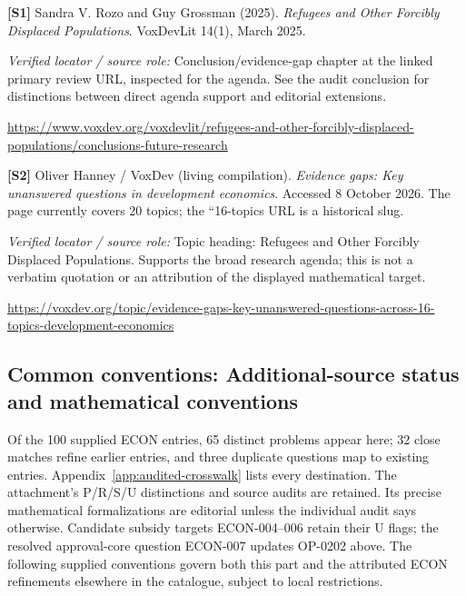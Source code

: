 \documentclass[11pt,a4paper]{article}
\begin{document}
{\footnotesize\raggedright
\par\noindent\textbf{[S1]} Sandra V. Rozo and Guy Grossman (2025). \emph{Refugees and Other Forcibly Displaced Populations}. VoxDevLit 14(1), March 2025.\par \textit{Verified locator / source role:} Conclusion/evidence-gap chapter at the linked primary review URL, inspected for the agenda. See the audit conclusion for distinctions between direct agenda support and editorial extensions.\par \url{https://www.voxdev.org/voxdevlit/refugees-and-other-forcibly-displaced-populations/conclusions-future-research}\par\smallskip
\par\noindent\textbf{[S2]} Oliver Hanney / VoxDev (living compilation). \emph{Evidence gaps: Key unanswered questions in development economics}. Accessed 8 October 2026. The page currently covers 20 topics; the ``16-topics URL is a historical slug.\par \textit{Verified locator / source role:} Topic heading: Refugees and Other Forcibly Displaced Populations. Supports the broad research agenda; this is not a verbatim quotation or an attribution of the displayed mathematical target.\par \url{https://voxdev.org/topic/evidence-gaps-key-unanswered-questions-across-16-topics-development-economics}\par\smallskip
}

\subsection*{Common conventions: Additional-source status and mathematical conventions}

\label{audited:conventions}

Of the 100 supplied ECON entries, 65 distinct problems appear here; 32 close
matches refine earlier entries, and three duplicate questions map to existing
entries. Appendix~\ref{app:audited-crosswalk} lists every destination.
The attachment's P/R/S/U distinctions and source audits are retained. Its
precise mathematical formalizations are editorial unless the individual audit
says otherwise. Candidate subsidy targets ECON-004--006 retain their U flags;
the resolved approval-core question ECON-007 updates OP-0202 above.
The following supplied conventions govern both this part and the attributed
ECON refinements elsewhere in the catalogue, subject to local restrictions.
\end{document}
